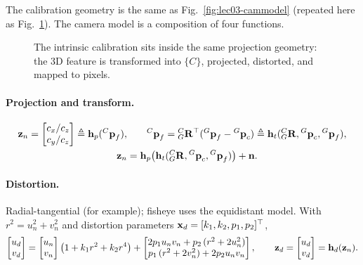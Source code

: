 The calibration geometry is the same as Fig.~\ref{fig:lec03-cammodel} (repeated here as Fig.~\ref{fig:lec03-calib}). The camera model is a composition of four functions.

\begin{figure}[H]
\centering
{}
\caption{The intrinsic calibration sits inside the same projection geometry: the 3D feature is transformed into $\{C\}$, projected, distorted, and mapped to pixels.}
\label{fig:lec03-calib}
\end{figure}

\paragraph{Projection and transform.}
\begin{align}
\boldsymbol{\mathbf{z}}_n = \begin{bmatrix} c_x/c_z \\ c_y/c_z \end{bmatrix} \triangleq \boldsymbol{\mathbf{h}}_p({}^{C}\boldsymbol{\mathbf{p}}_f), &\qquad
{}^{C}\boldsymbol{\mathbf{p}}_f = {}^{C}_{G}\boldsymbol{\mathbf{R}}^\top({}^{G}\boldsymbol{\mathbf{p}}_f - {}^{G}\boldsymbol{\mathbf{p}}_c) \triangleq \boldsymbol{\mathbf{h}}_t({}^{C}_{G}\boldsymbol{\mathbf{R}},{}^{G}\boldsymbol{\mathbf{p}}_c,{}^{G}\boldsymbol{\mathbf{p}}_f), \\
\boldsymbol{\mathbf{z}}_n &= \boldsymbol{\mathbf{h}}_p\big(\boldsymbol{\mathbf{h}}_t({}^{C}_{G}\boldsymbol{\mathbf{R}},{}^{G}\boldsymbol{\mathbf{p}}_c,{}^{G}\boldsymbol{\mathbf{p}}_f)\big) + \boldsymbol{\mathbf{n}}.
\end{align}
\paragraph{Distortion.} Radial-tangential (for example); fisheye uses the equidistant model. With $r^{2} = u_n^{2} + v_n^{2}$ and distortion parameters $\boldsymbol{\mathbf{x}}_d = [k_1,k_2,p_1,p_2]^\top$,
\begin{align}
\begin{bmatrix} u_d \\ v_d \end{bmatrix}
= \begin{bmatrix} u_n \\ v_n \end{bmatrix}\big(1 + k_1 r^{2} + k_2 r^{4}\big)
+ \begin{bmatrix} 2 p_1 u_n v_n + p_2\,(r^{2} + 2 u_n^{2}) \\ p_1\,(r^{2} + 2 v_n^{2}) + 2 p_2 u_n v_n \end{bmatrix}, \qquad
\boldsymbol{\mathbf{z}}_d = \begin{bmatrix} u_d \\ v_d \end{bmatrix} = \boldsymbol{\mathbf{h}}_d(\boldsymbol{\mathbf{z}}_n).
\end{align}
